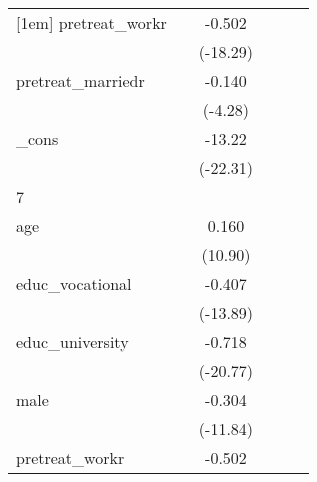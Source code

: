 {\begin{tabular}{l*{5}{c}}
[1em]
pretreat\_workr&                     &      -0.502\sym{***}&                     &                     &                     \\
            &                     &    (-18.29)         &                     &                     &                     \\
[1em]
pretreat\_marriedr&                     &      -0.140\sym{***}&                     &                     &                     \\
            &                     &     (-4.28)         &                     &                     &                     \\
[1em]
\_cons      &                     &      -13.22\sym{***}&                     &                     &                     \\
            &                     &    (-22.31)         &                     &                     &                     \\
\hline
7           &                     &                     &                     &                     &                     \\
age         &                     &       0.160\sym{***}&                     &                     &                     \\
            &                     &     (10.90)         &                     &                     &                     \\
[1em]
educ\_vocational&                     &      -0.407\sym{***}&                     &                     &                     \\
            &                     &    (-13.89)         &                     &                     &                     \\
[1em]
educ\_university&                     &      -0.718\sym{***}&                     &                     &                     \\
            &                     &    (-20.77)         &                     &                     &                     \\
[1em]
male        &                     &      -0.304\sym{***}&                     &                     &                     \\
            &                     &    (-11.84)         &                     &                     &                     \\
[1em]
pretreat\_workr&                     &      -0.502\sym{***}&                     &                     &                     \\

\end{tabular}}
